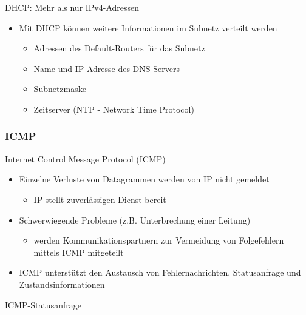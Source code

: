       DHCP: Mehr als nur IPv4-Adressen
      \begin{itemize}
        \item Mit DHCP können weitere Informationen im Subnetz verteilt werden
          \begin{itemize}
            \item Adressen des Default-Routers für das Subnetz
            \item Name und IP-Adresse des DNS-Servers
            \item Subnetzmaske
            \item Zeitserver (NTP - Network Time Protocol)
          \end{itemize}
      \end{itemize}
    \subsubsection{ICMP}
      Internet Control Message Protocol (ICMP)
      \begin{itemize}
        \item Einzelne Verluste von Datagrammen werden von IP nicht gemeldet
          \begin{itemize}
            \item IP stellt zuverlässigen Dienst bereit
          \end{itemize}
        \item Schwerwiegende Probleme (z.B. Unterbrechung einer Leitung)
          \begin{itemize}
            \item werden Kommunikationspartnern zur Vermeidung von Folgefehlern mittels ICMP mitgeteilt
          \end{itemize}
        \item ICMP unterstützt den Austausch von Fehlernachrichten, Statusanfrage und
          Zustandsinformationen
      \end{itemize}
      ICMP-Statusanfrage
